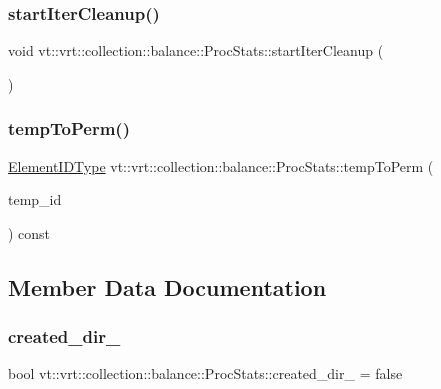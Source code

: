 \subsubsection{\texorpdfstring{start\+Iter\+Cleanup()}{startIterCleanup()}}
{\footnotesize\ttfamily void vt\+::vrt\+::collection\+::balance\+::\+Proc\+Stats\+::start\+Iter\+Cleanup (\begin{DoxyParamCaption}{ }\end{DoxyParamCaption})}

\mbox{\label{structvt_1_1vrt_1_1collection_1_1balance_1_1_proc_stats_afed5b2ba3c677167d38ae12c012ff993}} 
\subsubsection{\texorpdfstring{temp\+To\+Perm()}{tempToPerm()}}
{\footnotesize\ttfamily \hyperlink{namespacevt_1_1vrt_1_1collection_1_1balance_a14c8d2c972f2913aa3f1636e5be0a120}{Element\+I\+D\+Type} vt\+::vrt\+::collection\+::balance\+::\+Proc\+Stats\+::temp\+To\+Perm (\begin{DoxyParamCaption}\item[{\hyperlink{namespacevt_1_1vrt_1_1collection_1_1balance_a14c8d2c972f2913aa3f1636e5be0a120}{Element\+I\+D\+Type}}]{temp\+\_\+id }\end{DoxyParamCaption}) const}



\subsection{Member Data Documentation}
\mbox{\label{structvt_1_1vrt_1_1collection_1_1balance_1_1_proc_stats_a44e4994b863721b1a20bcd2333a1966b}} 
\subsubsection{\texorpdfstring{created\+\_\+dir\+\_\+}{created\_dir\_}}
{\footnotesize\ttfamily bool vt\+::vrt\+::collection\+::balance\+::\+Proc\+Stats\+::created\+\_\+dir\+\_\+ = false\hspace{0.3cm}{\ttfamily [private]}}



